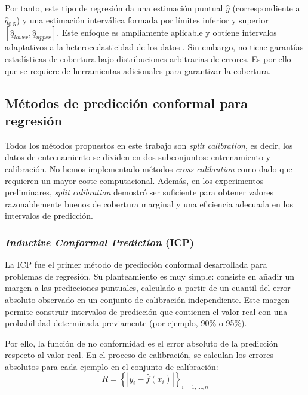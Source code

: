 Por tanto, este tipo de regresión da una estimación puntual $\hat{y}$ (correspondiente a $\hat{q}_{0.5}$) y 
una estimación interválica formada por límites inferior y superior 
$\left[ \hat{q}_{lower}, \hat{q}_{upper} \right]$. 
Este enfoque es ampliamente aplicable y obtiene intervalos adaptativos a la heterocedasticidad de los datos 
\cite{romano2019}. Sin embargo, no tiene garantías estadísticas de cobertura bajo distribuciones arbitrarias 
de errores. Es por ello que se requiere de herramientas adicionales para garantizar la cobertura.


\subsection{Métodos de predicción conformal para regresión}

Todos los métodos propuestos en este trabajo son \textit{split calibration}, es decir, los datos de 
entrenamiento se dividen en dos subconjuntos: entrenamiento y calibración. No hemos implementado métodos
\textit{cross-calibration} como \cite{barber2021} dado que requieren un mayor coste computacional.
Además, en los experimentos preliminares, \textit{split calibration} demostró ser suficiente para obtener
valores razonablemente buenos de cobertura marginal y una eficiencia adecuada en los intervalos de predicción.


\subsubsection{\textit{Inductive Conformal Prediction} (ICP)}

La ICP \cite{papadopoulos2002} fue el primer método de predicción conformal desarrollada para problemas de 
regresión. Su planteamiento es muy simple: consiste en añadir un margen a las predicciones puntuales, 
calculado a partir de un cuantil del error absoluto observado en un conjunto de calibración 
independiente. 
Este margen permite construir intervalos de predicción que contienen el valor real con una probabilidad 
determinada previamente (por ejemplo, 90\% o 95\%). 

Por ello, la función de no conformidad es el error absoluto de la predicción respecto al valor real.
En el proceso de calibración, se calculan los errores absolutos para cada ejemplo en el conjunto de 
calibración:
$$
R = \left\{ | y_i - \hat{f}(x_i) | \right\}_{i=1,...,n}
$$

